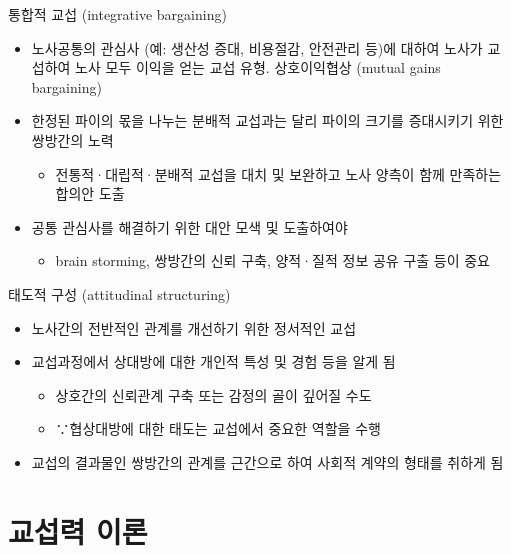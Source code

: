 \documentclass[aspectratio=169,xcolor=dvipsnames,handout]{beamer}
\begin{document}
\begin{frame}{통합적 교섭 (integrative bargaining)}
    \begin{itemize}[<+->]
        \item 노사공통의 관심사 (예: 생산성 증대, 비용절감, 안전관리 등)에 대하여 노사가 교섭하여 노사 모두 이익을 얻는 교섭 유형. 상호이익협상 (mutual gains bargaining)
        \item 한정된 파이의 몫을 나누는 분배적 교섭과는 달리 파이의 크기를 증대시키기 위한 쌍방간의 노력
        \begin{itemize}[<+->]
            \item 전통적·대립적·분배적 교섭을 대치 및 보완하고 노사 양측이 함께 만족하는 합의안 도출
        \end{itemize}
    \item 공통 관심사를 해결하기 위한 대안 모색 및 도출하여야
        \begin{itemize}[<+->]
            \item brain storming, 쌍방간의 신뢰 구축, 양적·질적 정보 공유 구출 등이 중요
        \end{itemize}
    \end{itemize}
\end{frame}

\begin{frame}{태도적 구성 (attitudinal structuring)}
    \begin{itemize}[<+->]
        \item 노사간의 전반적인 관계를 개선하기 위한 정서적인 교섭
        \item 교섭과정에서 상대방에 대한 개인적 특성 및 경험 등을 알게 됨
        \begin{itemize}[<+->]
            \item 상호간의 신뢰관계 구축 또는 감정의 골이 깊어질 수도
            \item ∵협상대방에 대한 태도는 교섭에서 중요한 역할을 수행
        \end{itemize}
    \item 교섭의 결과물인 쌍방간의 관계를 근간으로 하여 사회적 계약의 형태를 취하게 됨 
    \end{itemize}
\end{frame}

\section{교섭력 이론}
\end{document}
